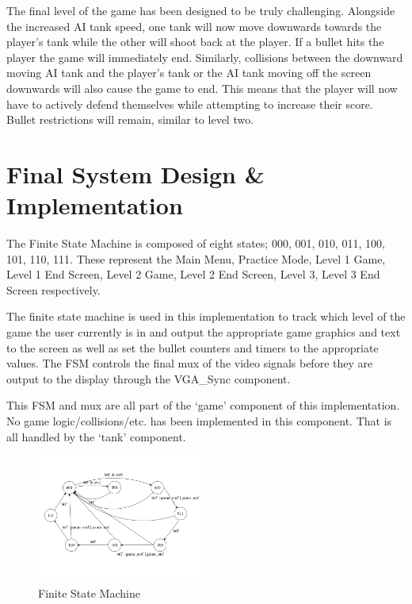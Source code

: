 \documentclass{article}
\begin{document}
The final level of the game has been designed to be truly challenging. Alongside the increased AI tank speed, one tank will now move downwards towards the player’s tank while the other will shoot back at the player. If a bullet hits the player the game will immediately end. Similarly, collisions between the downward moving AI tank and the player’s tank or the AI tank moving off the screen downwards will also cause the game to end. This means that the player will now have to actively defend themselves while attempting to increase their score. Bullet restrictions will remain, similar to level two. 

\section{Final System Design \& Implementation}

The Finite State Machine is composed of eight states; 000, 001, 010, 011, 100, 101, 110, 111. These represent the Main Menu, Practice Mode, Level 1 Game, Level 1 End Screen, Level 2 Game, Level 2 End Screen, Level 3, Level 3 End Screen respectively. 

The finite state machine is used in this implementation to track which level of the game the user currently is in and output the appropriate game graphics and text to the screen as well as set the bullet counters and timers to the appropriate values. The FSM controls the final mux of the video signals before they are output to the display through the VGA\_Sync component. 

This FSM and mux are all part of the `game' component of this implementation. No game logic/collisions/etc. has been implemented in this component. That is all handled by the `tank' component.

\begin{figure}[!h]
\centerline{\includegraphics[width=0.5\textwidth]{fsm}}
\caption{Finite State Machine}
\label{fig:rawFrame}
\end{figure}
\end{document}
